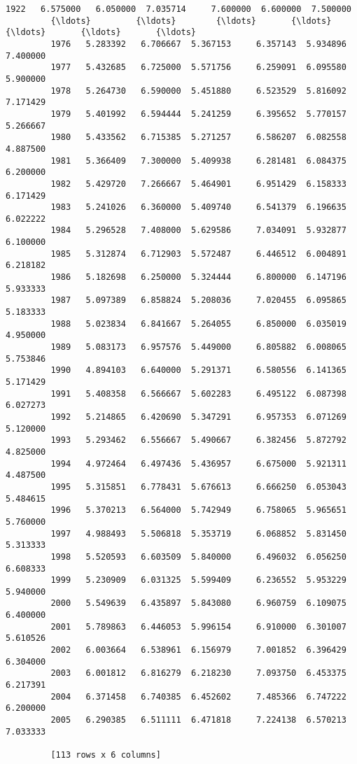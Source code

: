 \documentclass[11pt]{article}
\begin{document}
\begin{Verbatim}[commandchars=\\\{\}]
         1922   6.575000   6.050000  7.035714     7.600000  6.600000  7.500000
         {\ldots}         {\ldots}        {\ldots}       {\ldots}          {\ldots}       {\ldots}       {\ldots}
         1976   5.283392   6.706667  5.367153     6.357143  5.934896  7.400000
         1977   5.432685   6.725000  5.571756     6.259091  6.095580  5.900000
         1978   5.264730   6.590000  5.451880     6.523529  5.816092  7.171429
         1979   5.401992   6.594444  5.241259     6.395652  5.770157  5.266667
         1980   5.433562   6.715385  5.271257     6.586207  6.082558  4.887500
         1981   5.366409   7.300000  5.409938     6.281481  6.084375  6.200000
         1982   5.429720   7.266667  5.464901     6.951429  6.158333  6.171429
         1983   5.241026   6.360000  5.409740     6.541379  6.196635  6.022222
         1984   5.296528   7.408000  5.629586     7.034091  5.932877  6.100000
         1985   5.312874   6.712903  5.572487     6.446512  6.004891  6.218182
         1986   5.182698   6.250000  5.324444     6.800000  6.147196  5.933333
         1987   5.097389   6.858824  5.208036     7.020455  6.095865  5.183333
         1988   5.023834   6.841667  5.264055     6.850000  6.035019  4.950000
         1989   5.083173   6.957576  5.449000     6.805882  6.008065  5.753846
         1990   4.894103   6.640000  5.291371     6.580556  6.141365  5.171429
         1991   5.408358   6.566667  5.602283     6.495122  6.087398  6.027273
         1992   5.214865   6.420690  5.347291     6.957353  6.071269  5.120000
         1993   5.293462   6.556667  5.490667     6.382456  5.872792  4.825000
         1994   4.972464   6.497436  5.436957     6.675000  5.921311  4.487500
         1995   5.315851   6.778431  5.676613     6.666250  6.053043  5.484615
         1996   5.370213   6.564000  5.742949     6.758065  5.965651  5.760000
         1997   4.988493   5.506818  5.353719     6.068852  5.831450  5.313333
         1998   5.520593   6.603509  5.840000     6.496032  6.056250  6.608333
         1999   5.230909   6.031325  5.599409     6.236552  5.953229  5.940000
         2000   5.549639   6.435897  5.843080     6.960759  6.109075  6.400000
         2001   5.789863   6.446053  5.996154     6.910000  6.301007  5.610526
         2002   6.003664   6.538961  6.156979     7.001852  6.396429  6.304000
         2003   6.001812   6.816279  6.218230     7.093750  6.453375  6.217391
         2004   6.371458   6.740385  6.452602     7.485366  6.747222  6.200000
         2005   6.290385   6.511111  6.471818     7.224138  6.570213  7.033333
         
         [113 rows x 6 columns]
\end{Verbatim}
            
\end{document}
